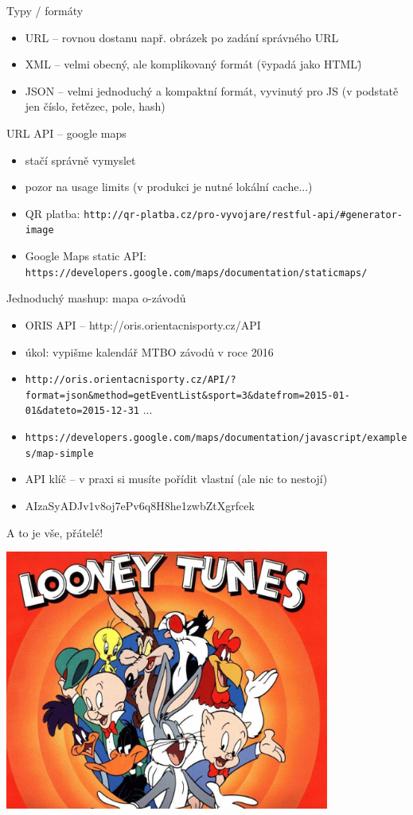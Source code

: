 \documentclass{beamer}
\begin{document}
\begin{frame}{Typy / formáty}
  \begin{itemize}
    \item URL -- rovnou dostanu např. obrázek po zadání správného URL
    \item XML -- velmi obecný, ale komplikovaný formát (\"vypadá jako HTML\")
    \item JSON -- velmi jednoduchý a kompaktní formát, vyvinutý pro JS (v podstatě jen číslo, řetězec, pole, hash)
  \end{itemize}
\end{frame}


\begin{frame}{URL API -- google maps}
  \begin{itemize}
    \item stačí správně vymyslet 
    \item pozor na usage limits (v produkci je nutné lokální cache...) 
    \item QR platba: \texttt{http://qr-platba.cz/pro-vyvojare/restful-api/\#generator-image}
    \item Google Maps static API: \texttt{https://developers.google.com/maps/documentation/staticmaps/}
  \end{itemize}
\end{frame}


\begin{frame}{Jednoduchý mashup: mapa o-závodů}
  \begin{itemize}
    \item ORIS API -- http://oris.orientacnisporty.cz/API
    \item úkol: vypišme kalendář MTBO závodů v roce 2016
    \item \texttt{http://oris.orientacnisporty.cz/API/?format=json\&method=getEventList\&sport=3\&datefrom=2015-01-01\&dateto=2015-12-31} ...
    \item \texttt{https://developers.google.com/maps/documentation/javascript/examples/map-simple}
    \item API klíč -- v praxi si musíte pořídit vlastní (ale nic to nestojí)
    \item AIzaSyADJv1v8oj7ePv6q8H8he1zwbZtXgrfcek
  \end{itemize}
\end{frame}

\begin{frame}{A to je vše, přátelé!}
  \begin{center}
    \includegraphics[width=0.8\textwidth]{looney_tunes}
  \end{center}
\end{frame}
\end{document}
